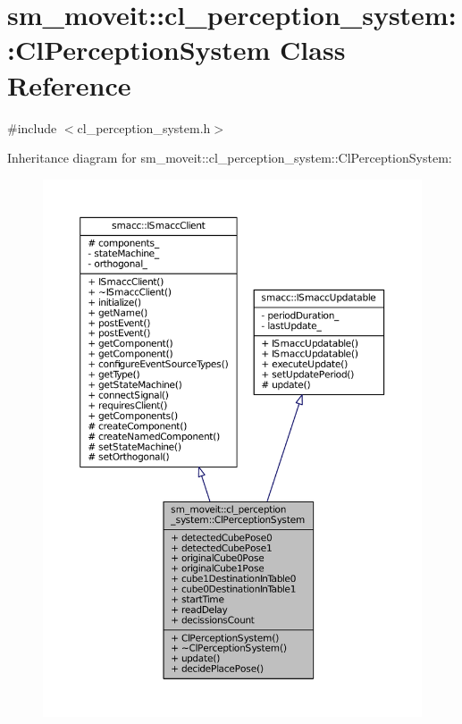 \hypertarget{classsm__moveit_1_1cl__perception__system_1_1ClPerceptionSystem}{}\section{sm\+\_\+moveit\+:\+:cl\+\_\+perception\+\_\+system\+:\+:Cl\+Perception\+System Class Reference}
\label{classsm__moveit_1_1cl__perception__system_1_1ClPerceptionSystem}


{\ttfamily \#include $<$cl\+\_\+perception\+\_\+system.\+h$>$}



Inheritance diagram for sm\+\_\+moveit\+:\+:cl\+\_\+perception\+\_\+system\+:\+:Cl\+Perception\+System\+:
\nopagebreak
\begin{figure}[H]
\begin{center}
\leavevmode
\includegraphics[width=350pt]{classsm__moveit_1_1cl__perception__system_1_1ClPerceptionSystem__inherit__graph}
\end{center}
\end{figure}


